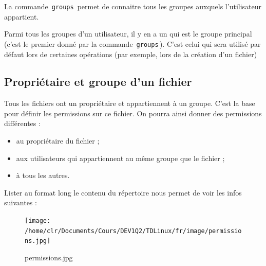 \documentclass[11pt,a4paper]{article}
\begin{document}
            \par
        
				  La commande \,\verb|groups|\, permet de connaitre tous les groupes 
				  auxquels l'utilisateur appartient.
				
            \par
        
				  Parmi tous les groupes d'un utilisateur, il y en a un qui est le groupe principal (c'est le premier donn\'e par la commande \,\verb|groups|\,). 
				  C'est celui qui sera utilis\'e par d\'efaut lors de certaines op\'erations (par exemple, lors de la cr\'eation d'un fichier)
				
            \par
        \subsection{Propri\'etaire et groupe d'un fichier}
					Tous les fichiers ont un propri\'etaire et appartiennent \`a un groupe.
					C'est la base pour d\'efinir les permissions sur ce fichier.
					On pourra ainsi donner des permissions diff\'erentes :
					
					\begin{itemize}
				
			\item au propri\'etaire du fichier ;
			\item aux utilisateurs qui appartiennent au m\^eme groupe que le fichier ;
			\item  \`a tous les autres. 
					\end{itemize}
				
            \par
        
				  Lister au format long le contenu du r\'epertoire nous permet de voir les infos suivantes :
				
            \par
        \begin{figure}[hbt]
				    \begin{center}
					\texttt{[image: /home/clr/Documents/Cours/DEV1Q2/TDLinux/fr/image/permissions.jpg]}
						\end{center}
                
                    \caption[permissions.jpg]{permissions.jpg}
                \end{figure}
                    
            \par
        
\end{document}

